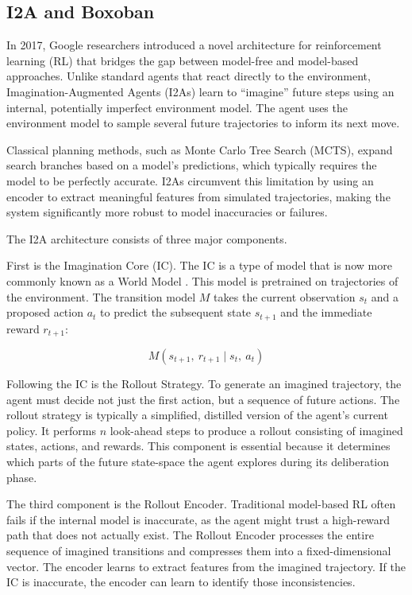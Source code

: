 \subsection{I2A and Boxoban}
In 2017, Google researchers introduced a novel architecture \cite{NEURIPS2017_7ca66fc0} for reinforcement learning (RL) that bridges the gap between model-free and model-based approaches. Unlike standard agents that react directly to the environment, Imagination-Augmented Agents (I2As) learn to ``imagine'' future steps using an internal, potentially imperfect environment model. The agent uses the environment model to sample several future trajectories to inform its next move.

Classical planning methods, such as Monte Carlo Tree Search (MCTS), expand search branches based on a model's predictions, which typically requires the model to be perfectly accurate. I2As circumvent this limitation by using an encoder to extract meaningful features from simulated trajectories, making the system significantly more robust to model inaccuracies or failures.

The I2A architecture consists of three major components.

First is the Imagination Core (IC). The IC is a type of model that is now more commonly known as a World Model \cite{worldmodel}. This model is pretrained on trajectories of the environment. The transition model $M$ takes the current observation $s_t$ and a proposed action $a_t$ to predict the subsequent state $s_{t+1}$ and the immediate reward $r_{t+1}$:

\[M(s_{t+1},\ r_{t+1}\mid s_t,\ a_t)\]

Following the IC is the Rollout Strategy. To generate an imagined trajectory, the agent must decide not just the first action, but a sequence of future actions. The rollout strategy is typically a simplified, distilled version of the agent's current policy. It performs $n$ look-ahead steps to produce a rollout consisting of imagined states, actions, and rewards. This component is essential because it determines which parts of the future state-space the agent explores during its deliberation phase.

The third component is the Rollout Encoder. Traditional model-based RL often fails if the internal model is inaccurate, as the agent might trust a high-reward path that does not actually exist. The Rollout Encoder processes the entire sequence of imagined transitions and compresses them into a fixed-dimensional vector. The encoder learns to extract features from the imagined trajectory. If the IC is inaccurate, the encoder can learn to identify those inconsistencies.

